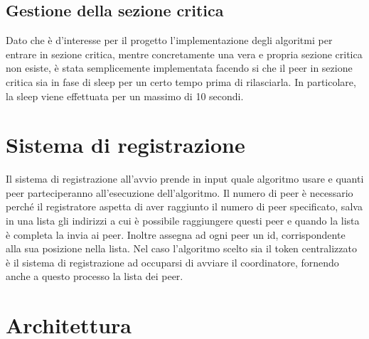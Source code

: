 \documentclass[conference]{IEEEtran}
\begin{document}
\subsection*{Gestione della sezione critica}

Dato che è d'interesse per il progetto l'implementazione degli algoritmi per entrare in sezione critica, mentre concretamente una vera e propria sezione critica non esiste, è stata semplicemente implementata facendo si che il peer in sezione critica sia in fase di sleep per un certo tempo prima di rilasciarla. In particolare, la sleep viene effettuata per un massimo di 10 secondi.

\section{Sistema di registrazione}

Il sistema di registrazione all'avvio prende in input quale algoritmo usare e quanti peer parteciperanno all'esecuzione dell'algoritmo. Il numero di peer è necessario perché il registratore aspetta di aver raggiunto il numero di peer specificato, salva in una lista gli indirizzi a cui è possibile raggiungere questi peer e quando la lista è completa la invia ai peer. Inoltre assegna ad ogni peer un id, corrispondente alla sua posizione nella lista. Nel caso l'algoritmo scelto sia il token centralizzato è il sistema di registrazione ad occuparsi di avviare il coordinatore, fornendo anche a questo processo la lista dei peer.

\section{Architettura}
\end{document}
